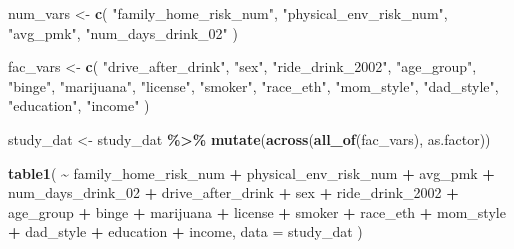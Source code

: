 \documentclass[
]{article}
\newenvironment{Shaded}{\begin{snugshade}}{\end{snugshade}}
\newcommand{\AttributeTok}[1]{\textcolor[rgb]{0.13,0.29,0.53}{#1}}
\newcommand{\FunctionTok}[1]{\textcolor[rgb]{0.13,0.29,0.53}{\textbf{#1}}}
\newcommand{\NormalTok}[1]{#1}
\newcommand{\OtherTok}[1]{\textcolor[rgb]{0.56,0.35,0.01}{#1}}
\newcommand{\SpecialCharTok}[1]{\textcolor[rgb]{0.81,0.36,0.00}{\textbf{#1}}}
\newcommand{\StringTok}[1]{\textcolor[rgb]{0.31,0.60,0.02}{#1}}
\begin{document}
\begin{Shaded}
\begin{Highlighting}[]
\NormalTok{num\_vars }\OtherTok{\textless{}{-}} \FunctionTok{c}\NormalTok{(}
  \StringTok{"family\_home\_risk\_num"}\NormalTok{,}
  \StringTok{"physical\_env\_risk\_num"}\NormalTok{,}
  \StringTok{"avg\_pmk"}\NormalTok{,}
  \StringTok{"num\_days\_drink\_02"}
\NormalTok{)}

\NormalTok{fac\_vars }\OtherTok{\textless{}{-}} \FunctionTok{c}\NormalTok{(}
  \StringTok{"drive\_after\_drink"}\NormalTok{, }\StringTok{"sex"}\NormalTok{,}
  \StringTok{"ride\_drink\_2002"}\NormalTok{, }\StringTok{"age\_group"}\NormalTok{, }\StringTok{"binge"}\NormalTok{, }\StringTok{"marijuana"}\NormalTok{,}
  \StringTok{"license"}\NormalTok{, }\StringTok{"smoker"}\NormalTok{, }\StringTok{"race\_eth"}\NormalTok{, }\StringTok{"mom\_style"}\NormalTok{,}
  \StringTok{"dad\_style"}\NormalTok{, }\StringTok{"education"}\NormalTok{, }\StringTok{"income"}
\NormalTok{) }

\NormalTok{study\_dat }\OtherTok{\textless{}{-}}\NormalTok{ study\_dat }\SpecialCharTok{\%\textgreater{}\%}
  \FunctionTok{mutate}\NormalTok{(}\FunctionTok{across}\NormalTok{(}\FunctionTok{all\_of}\NormalTok{(fac\_vars), as.factor))}

\FunctionTok{table1}\NormalTok{(}
  \SpecialCharTok{\textasciitilde{}}\NormalTok{ family\_home\_risk\_num }\SpecialCharTok{+}
\NormalTok{    physical\_env\_risk\_num }\SpecialCharTok{+}
\NormalTok{    avg\_pmk }\SpecialCharTok{+}
\NormalTok{    num\_days\_drink\_02 }\SpecialCharTok{+}
\NormalTok{    drive\_after\_drink }\SpecialCharTok{+}
\NormalTok{    sex }\SpecialCharTok{+}
\NormalTok{    ride\_drink\_2002 }\SpecialCharTok{+}
\NormalTok{    age\_group }\SpecialCharTok{+}
\NormalTok{    binge }\SpecialCharTok{+}
\NormalTok{    marijuana }\SpecialCharTok{+}
\NormalTok{    license }\SpecialCharTok{+}
\NormalTok{    smoker }\SpecialCharTok{+}
\NormalTok{    race\_eth }\SpecialCharTok{+}
\NormalTok{    mom\_style }\SpecialCharTok{+}
\NormalTok{    dad\_style }\SpecialCharTok{+}
\NormalTok{    education }\SpecialCharTok{+}
\NormalTok{    income,}
  \AttributeTok{data =}\NormalTok{ study\_dat}
\NormalTok{) }
\end{Highlighting}
\end{Shaded}
\end{document}
